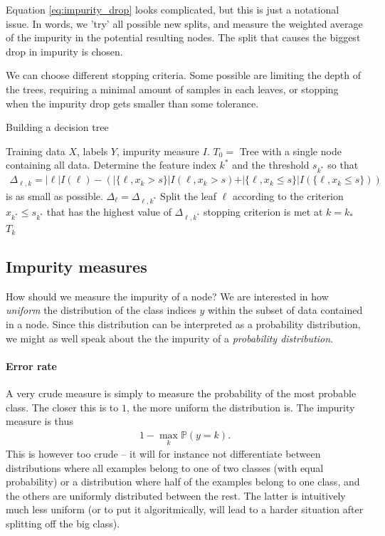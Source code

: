 \documentclass{article}
\newcommand{\abs}[1]{\vert #1 \vert}
\begin{document}
Equation \eqref{eq:impurity_drop} looks complicated, but this is just a notational issue. In words, we 'try' all possible new splits, and measure the weighted average of the impurity in the potential resulting nodes. The split that causes the biggest drop in impurity is chosen.

We can choose different stopping criteria. Some possible are limiting the depth of the trees, requiring a minimal amount of samples in each leaves, or stopping when the impurity drop gets smaller than some tolerance.

\begin{algorithm}[tb]      
	\caption{Building a decision tree} 
	\begin{algorithmic} [1]
 		\REQUIRE Training data $X$, labels $Y$, impurity measure $I$.\label{alg:decision_build}
 		\STATE $T_0=$ Tree with a single node containing all data.
 		\REPEAT
                \STATE Determine the feature index $k^*$ and the threshold $s_{k^*}$ so that
                \begin{align}
                    \Delta_{\ell,k} = \abs{\ell} I(\ell)  - \left(\abs{\{\ell, x_k>s\}} I(\ell, x_k>s) + \abs{\{\ell, x_k\leq s\}} I(\{\ell, x_k\leq s\})\right) \label{eq:impurity_drop}
                \end{align}
                is as small as possible.
                \STATE $\Delta_\ell = \Delta_{\ell,k^*}$
            \ENDFOR
            \STATE Split the leaf $\ell$ according to the criterion $x_{k^*}\leq s_{k^*}$ that has the highest value of $\Delta_{\ell,k^*}$
 		\UNTIL stopping criterion is met at $k= k_*$
 		\RETURN $T_k$
	\end{algorithmic}
\end{algorithm}

\subsection{Impurity measures} How should we measure the impurity of a node? We are interested in how \emph{uniform} the distribution of the class indices $y$ within the subset of data contained in a node. Since this distribution can be interpreted as a probability distribution, we might as well speak about the the impurity of a \emph{probability distribution}.

\paragraph{Error rate} A very crude measure is simply to measure the probability of the most probable class. The closer this is to $1$, the more uniform the distribution is. The impurity measure is thus
\begin{align*}
    1 - \max_k \mathbb{P}(y=k).
\end{align*}
This is however too crude -- it will for instance not differentiate between distributions where all examples belong to one of two classes (with equal probability) or a distribution where half of the examples belong to one class, and the others are uniformly distributed between the rest. The latter is intuitively much less uniform (or to put it algoritmically, will lead to a harder situation after splitting off the big class).
\end{document}
